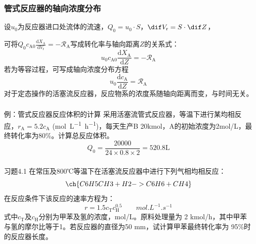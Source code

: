\documentclass[dvipsnames, svgnames, x11names]{beamer}
\begin{document}
\begin{frame}
    \frametitle{管式反应器的轴向浓度分布}

    设$u_0$为反应器进口处流体的流速，$Q_0 = u_0\cdot S$，$\dif V_\mathrm{r} = S\cdot \dif Z$，
    
    可将$Q_0 c_{\mathrm{A0}} \frac{\mathrm{d} X_{\mathrm{A}}}{\mathrm{d} V_{\mathrm{r}}}=-\mathscr{R}_{\mathrm{A}}$写成转化率与轴向距离$Z$的关系式：
    \[
        u_0 c_{\mathrm{A0}} \frac{\mathrm{d} X_{\mathrm{A}}}{\mathrm{d} Z}=-\mathscr{R}_{\mathrm{A}}
    \]
    若为等容过程，可写成轴向浓度分布方程
    \[
        u_0 \frac{\mathrm{d} c_{\mathrm{A}}}{\mathrm{d} Z}=\mathscr{R}_{\mathrm{A}}
    \]
    对于定态操作的活塞流反应器，反应物系的浓度系随轴向距离而变，与时间无关。

    

\end{frame}


\begin{frame}[t]
    \frametitle{}
    \begin{block}{例：管式反应器反应体积的计算}
        采用活塞流管式反应器，等温下进行某均相反应，$r_\mathrm{A}=5.2c_\mathrm{A}$ (\si{mol.L^{-1}.h^{-1}})，每天生产B 20kmol，A的初始浓度为2mol/L，最终转化率为80\%。计算总反应体积。
    \tcblower
    \vspace{-0.5em}
    \[
        Q_0 = \frac{20000}{24\times 0.8 \times 2} = 520.8 \mathrm{L}
    \]
    \pause
    \end{block}
\end{frame}


\begin{frame}[t]
    \frametitle{}
    \begin{redblock}{习题4.1}
        在常压及800℃等温下在活塞流反应器中进行下列气相均相反应：
        \[
            \ch{C6H5CH3 + H2 -> C6H6 + CH4}
        \]
        在反应条件下该反应的速率方程为：
        \[
            r = 1.5 c_\mathrm{T} c_\mathrm{H}^{0.5} \qquad \si{mol.L^{-1}.s^{-1}}
        \]
        式中$c_\mathrm{T}$及$c_\mathrm{H}$分别为甲苯及氢的浓度，mol/L。原料处理量为 2 kmol/h，其中甲苯与氢的摩尔比等于1。若反应器的直径为50 mm，试计算甲苯最终转化率为 95\%时的反应器长度。
    \end{redblock}
\end{frame}
\end{document}
